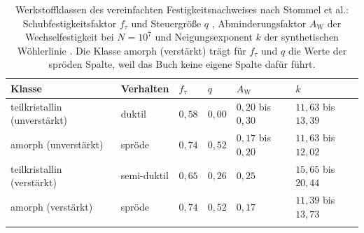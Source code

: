 \begin{table}[htbp]
    \caption{Werkstoffklassen des vereinfachten Festigkeitsnachweises nach Stommel et al.: Schubfestigkeitsfaktor $f_{\tau}$ und Steuergröße $q$ \cite[Tabelle 6.1, S.~323]{Sto18}, Abminderungsfaktor $A_{\mathrm{W}}$ der Wechselfestigkeit bei $N = 10^{7}$ \cite[Bild 6.26, S.~362]{Sto18} und Neigungsexponent $k$ der synthetischen Wöhlerlinie \cite[Tabelle 6.3, S.~371]{Sto18}. Die Klasse amorph (verstärkt) trägt für $f_{\tau}$ und $q$ die Werte der spröden Spalte, weil das Buch keine eigene Spalte dafür führt.}
    \label{tab:anhang_klassen_festigkeit}
    \centering
    \footnotesize
    \setlength{\tabcolsep}{4pt}
    \begin{tabular}{L{3.6cm}L{1.9cm}llL{2.4cm}L{2.6cm}}
        Klasse & Verhalten & $f_{\tau}$ & $q$ & $A_{\mathrm{W}}$ & $k$ \\
        \hline
        teilkristallin (unverstärkt) & duktil & $0{,}58$ & $0{,}00$ & $0{,}20$ bis $0{,}30$ & $11{,}63$ bis $13{,}39$ \\
        \hline
        amorph (unverstärkt) & spröde & $0{,}74$ & $0{,}52$ & $0{,}17$ bis $0{,}20$ & $11{,}63$ bis $12{,}02$ \\
        \hline
        teilkristallin (verstärkt) & semi-duktil & $0{,}65$ & $0{,}26$ & $0{,}25$ & $15{,}65$ bis $20{,}44$ \\
        \hline
        amorph (verstärkt) & spröde & $0{,}74$ & $0{,}52$ & $0{,}17$ & $11{,}39$ bis $13{,}73$ \\
        \hline
    \end{tabular}
\end{table}
